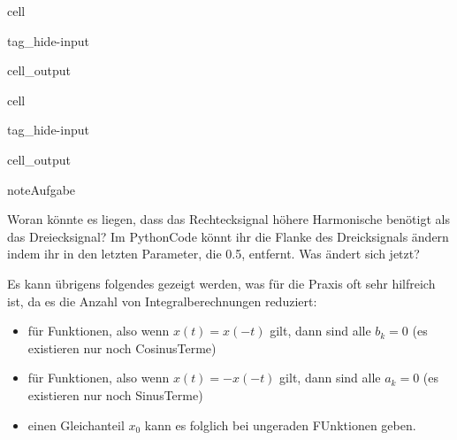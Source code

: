 \documentclass[letterpaper,10pt,english]{jupyterBook}
\begin{document}
\begin{sphinxuseclass}{cell}
\begin{sphinxuseclass}{tag_hide-input}\begin{sphinxVerbatimOutput}

\begin{sphinxuseclass}{cell_output}
\noindent{}

\end{sphinxuseclass}\end{sphinxVerbatimOutput}

\end{sphinxuseclass}
\end{sphinxuseclass}
\begin{sphinxuseclass}{cell}
\begin{sphinxuseclass}{tag_hide-input}\begin{sphinxVerbatimOutput}

\begin{sphinxuseclass}{cell_output}
\noindent{}

\end{sphinxuseclass}\end{sphinxVerbatimOutput}

\end{sphinxuseclass}
\end{sphinxuseclass}
\begin{sphinxadmonition}{note}{Aufgabe}

\sphinxAtStartPar
Woran könnte es liegen, dass das Rechtecksignal höhere Harmonische benötigt als das Dreiecksignal? Im Python\sphinxhyphen{}Code könnt ihr die Flanke des Dreicksignals ändern indem ihr in  den letzten Parameter, die 0.5, entfernt. Was ändert sich jetzt?
\end{sphinxadmonition}

\sphinxAtStartPar
Es kann übrigens folgendes gezeigt werden, was für die Praxis oft sehr hilfreich ist, da es die Anzahl von Integralberechnungen reduziert:
\begin{itemize}
\item {} 
\sphinxAtStartPar
für  Funktionen, also wenn \(x(t) = x(-t)\) gilt, dann sind alle \(b_k = 0\) (es existieren nur noch Cosinus\sphinxhyphen{}Terme)

\item {} 
\sphinxAtStartPar
für  Funktionen, also wenn \(x(t) = -x(-t)\) gilt, dann sind alle \(a_k = 0\) (es existieren nur noch Sinus\sphinxhyphen{}Terme)

\item {} 
\sphinxAtStartPar
einen Gleichanteil \(x_0\) kann es folglich bei ungeraden FUnktionen  geben.

\end{itemize}
\end{document}
